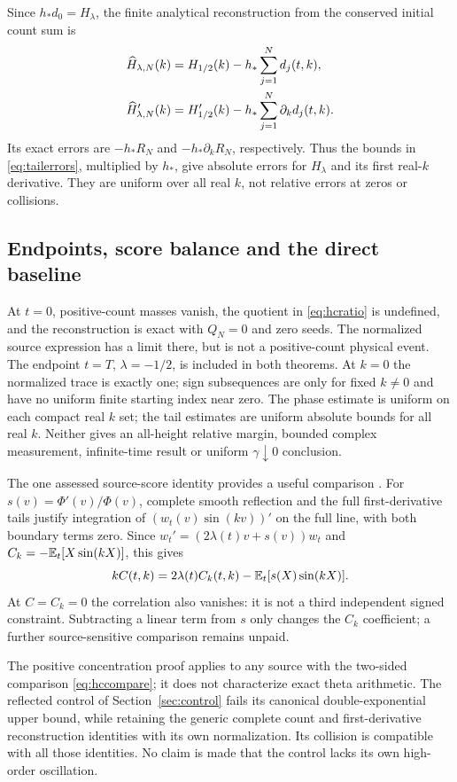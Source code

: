 Since $h_*d_0=H_\lambda$, the finite analytical reconstruction from the
conserved initial count sum is
\begin{align}
 \widehat H_{\lambda,N}(k)&=H_{1/2}(k)-h_*\sum_{j=1}^Nd_j(t,k),
 \label{eq:tailreconstruction}\\
 \widehat H_{\lambda,N}'(k)&=H_{1/2}'(k)-h_*\sum_{j=1}^N\partial_kd_j(t,k).
 \notag
\end{align}
Its exact errors are $-h_*R_N$ and $-h_*\partial_kR_N$, respectively.
Thus the bounds in \eqref{eq:tailerrors}, multiplied by $h_*$, give
absolute errors for $H_\lambda$ and its first real-$k$ derivative. They
are uniform over all real $k$, not relative errors at zeros or collisions.

\subsection{Endpoints, score balance and the direct baseline}
At $t=0$, positive-count masses vanish, the quotient in
\eqref{eq:hcratio} is undefined, and the reconstruction is exact with
$Q_N=0$ and zero seeds. The normalized source expression has a limit
there, but is not a positive-count physical event. The endpoint $t=T$,
$\lambda=-1/2$, is included in both theorems. At $k=0$ the normalized
trace is exactly one; sign subsequences are only for fixed $k\ne0$ and
have no uniform finite starting index near zero. The phase estimate is
uniform on each compact real $k$ set; the tail estimates are uniform
absolute bounds for all real $k$. Neither gives an all-height relative
margin, bounded complex measurement, infinite-time result or uniform
$\gamma\downarrow0$ conclusion.

The one assessed source-score identity provides a useful comparison
\cite{TNDSourceCountDecision,TNDHighCountReview}. For $s(v)=\Phi'(v)/\Phi(v)$,
complete smooth reflection and the full first-derivative tails justify
integration of $(w_t(v)\sin(kv))'$ on the full line, with both boundary
terms zero. Since $w_t'=(2\lambda(t)v+s(v))w_t$ and
$C_k=-\mathbb E_t[X\sin(kX)]$, this gives
\begin{equation}\label{eq:scorebalance}
 kC(t,k)=2\lambda(t)C_k(t,k)-\mathbb E_t[s(X)\sin(kX)].
\end{equation}
At $C=C_k=0$ the correlation also vanishes: it is not a third independent
signed constraint. Subtracting a linear term from $s$ only changes the
$C_k$ coefficient; a further source-sensitive comparison remains unpaid.

The positive concentration proof applies to any source with the two-sided
comparison \eqref{eq:hccompare}; it does not characterize exact theta
arithmetic. The reflected control of Section~\ref{sec:control} fails its
canonical double-exponential upper bound, while retaining the generic
complete count and first-derivative reconstruction identities with its own
normalization. Its collision is compatible with all those identities.
No claim is made that the control lacks its own high-order oscillation.

